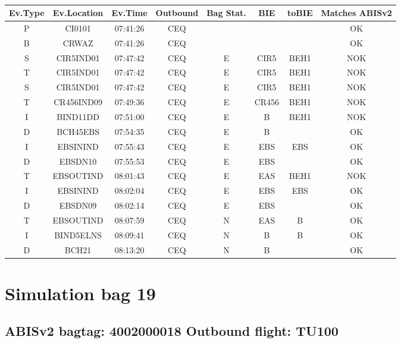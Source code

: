 \documentclass{report}
\begin{document}
\paragraph{}
\begin{longtable}{cccccccc}    \toprule
\rowcolor{white!50}
\textbf{Ev.Type} & \textbf{Ev.Location} & \textbf{Ev.Time} & \textbf{Outbound} & \textbf{Bag Stat.} & \textbf{BIE} & \textbf{toBIE} & \textbf{Matches ABISv2} \\\midrule
P & CI0101 & 07:41:26  & CEQ &  &  &  & OK\\
B & CRWAZ & 07:41:26  & CEQ &  &  &  & OK\\
S & CIR5IND01 & 07:47:42  & CEQ & E & CIR5 & BEH1 & NOK\\
T & CIR5IND01 & 07:47:42  & CEQ & E & CIR5 & BEH1 & NOK\\
S & CIR5IND01 & 07:47:42  & CEQ & E & CIR5 & BEH1 & NOK\\
T & CR456IND09 & 07:49:36  & CEQ & E & CR456 & BEH1 & NOK\\
I & BIND11DD & 07:51:00  & CEQ & E & B & BEH1 & NOK\\
D & BCH45EBS & 07:54:35  & CEQ & E & B &  & OK\\
I & EBSININD & 07:55:43  & CEQ & E & EBS & EBS & OK\\
D & EBSDN10 & 07:55:53  & CEQ & E & EBS &  & OK\\
T & EBSOUTIND & 08:01:43  & CEQ & E & EAS & BEH1 & NOK\\
I & EBSININD & 08:02:04  & CEQ & E & EBS & EBS & OK\\
D & EBSDN09 & 08:02:14  & CEQ & E & EBS &  & OK\\
T & EBSOUTIND & 08:07:59  & CEQ & N & EAS & B & OK\\
I & BIND5ELNS & 08:09:41  & CEQ & N & B & B & OK\\
D & BCH21 & 08:13:20  & CEQ & N & B &  & OK\\
\bottomrule
\end{longtable}
\pagebreak
\section*{Simulation bag 19}
\subsection*{ABISv2 bagtag: 4002000018 Outbound flight: TU100}
\end{document}
